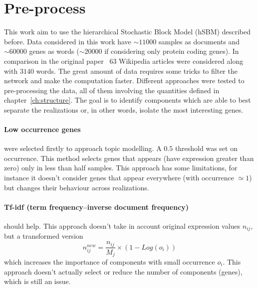 \section{Pre-process}
This work aim to use the hierarchical Stochastic Block Model (hSBM) described before. Data considered in this work have $\sim 11000$ samples as documents and $\sim 60000$ genes as words ($\sim 20000$ if considering only protein coding genes). In comparison in the original paper~\cite{gerlach2018network} $63$ Wikipedia articles were considered along with $3140$ words. The great amount of data requires some tricks to filter the network and make the computation faster.
Different approaches were tested to pre-processing the data, all of them involving the quantities defined in chapter~\ref{ch:structure}. The goal is to identify components which are able to best separate the realizations or, in other words, isolate the most interesting genes. 
\paragraph{Low occurrence genes} were selected firstly to approach topic modelling. A $0.5$ threshold was set on occurrence. This method selects genes that appears (have expression greater than zero) only in less than half samples. This approach has some limitations, for instance it doesn't consider genes that appear everywhere (with occurrence $\simeq 1$) but changes their behaviour across realizations.

\paragraph{Tf-idf (term frequency–inverse document frequency)} should help. This approach doesn't take in account original expression values $n_{ij}$, but a transformed version
\[
n^{new}_{ij}=\frac{n_{i j}}{M_j}\times \left(1-Log\left(o_i\right)\right)
\] which increases the importance of components with small occurrence $o_i$. This approach doesn't actually select or reduce the number of components (genes), which is still an issue.

